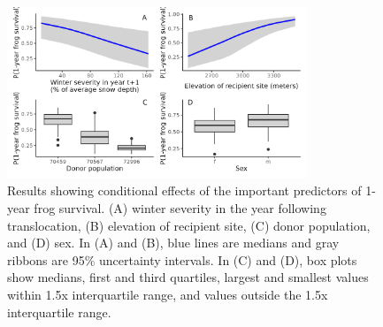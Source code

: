 \documentclass[9pt,twocolumn,twoside,lineno]{pnas-new}
\begin{document}
\begin{figure}

{\centering \includegraphics[width=0.8\textwidth]{figures/cond_effects_plot.png}

}

\caption{\label{fig-cond-effects}Results showing conditional effects of
the important predictors of 1-year frog survival. (A) winter severity in
the year following translocation, (B) elevation of recipient site, (C)
donor population, and (D) sex. In (A) and (B), blue lines are medians
and gray ribbons are 95\% uncertainty intervals. In (C) and (D), box
plots show medians, first and third quartiles, largest and smallest
values within 1.5x interquartile range, and values outside the 1.5x
interquartile range.}

\end{figure}

\newpage
\end{document}
